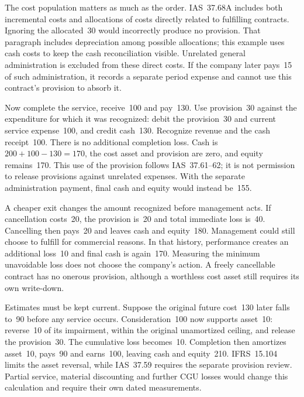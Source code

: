 The cost population matters as much as the order. IAS~37.68A includes both
incremental costs and allocations of costs directly related to fulfilling
contracts. Ignoring the allocated~30 would incorrectly produce no provision.
That paragraph includes depreciation among possible allocations; this example
uses cash costs to keep the cash reconciliation visible. Unrelated general
administration is excluded from these direct costs. If the company later
pays~15 of such administration, it records a separate period expense and
cannot use this contract's provision to absorb it.

Now complete the service, receive~100 and pay~130. Use provision~30 against
the expenditure for which it was recognized: debit the provision~30 and
current service expense~100, and credit cash~130. Recognize revenue and the
cash receipt~100. There is no additional completion loss. Cash is
\(200+100-130=170\), the cost asset and provision are zero, and equity
remains~170. This use of the provision follows IAS~37.61--62; it is not
permission to release provisions against unrelated expenses. With the separate
administration payment, final cash and equity would instead be~155.

A cheaper exit changes the amount recognized before management acts. If
cancellation costs~20, the provision is~20 and total immediate loss is~40.
Cancelling then pays~20 and leaves cash and equity~180. Management could still
choose to fulfill for commercial reasons. In that history, performance creates
an additional loss~10 and final cash is again~170. Measuring the minimum
unavoidable loss does not choose the company's action. A freely cancellable
contract has no onerous provision, although a worthless cost asset still
requires its own write-down.

Estimates must be kept current. Suppose the original future cost~130 later
falls to~90 before any service occurs. Consideration~100 now supports asset~10:
reverse~10 of its impairment, within the original unamortized ceiling, and
release the provision~30. The cumulative loss becomes~10. Completion then
amortizes asset~10, pays~90 and earns~100, leaving cash and equity~210.
IFRS~15.104 limits the asset reversal, while IAS~37.59 requires the separate
provision review. Partial service, material discounting and further CGU losses
would change this calculation and require their own dated measurements.

